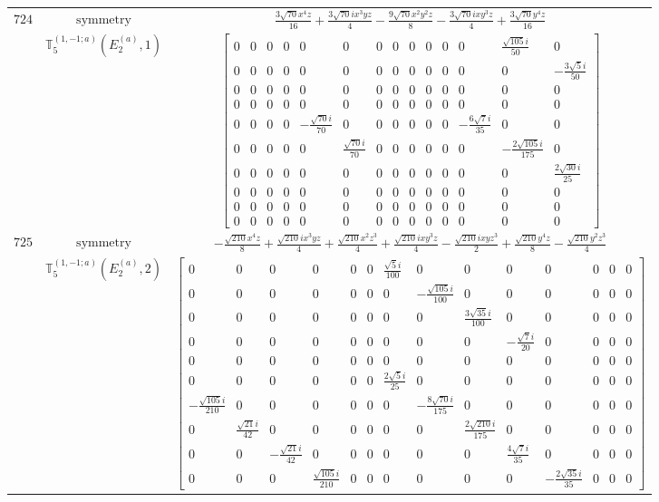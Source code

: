 \documentclass[fleqn,8pt,landscape]{jsarticle}
\begin{document}
\begin{longtable}{ccc}
$ 724 $ & $ \text{symmetry} $ & $ \frac{3 \sqrt{70} x^{4} z}{16} + \frac{3 \sqrt{70} i x^{3} y z}{4} - \frac{9 \sqrt{70} x^{2} y^{2} z}{8} - \frac{3 \sqrt{70} i x y^{3} z}{4} + \frac{3 \sqrt{70} y^{4} z}{16} $ \\
$  $ & $ \mathbb{T}_{5}^{(1,-1;a)}(E_{2}^{(a)},1) $ & $ \begin{bmatrix} 0 & 0 & 0 & 0 & 0 & 0 & 0 & 0 & 0 & 0 & 0 & 0 & \frac{\sqrt{105} i}{50} & 0 \\ 0 & 0 & 0 & 0 & 0 & 0 & 0 & 0 & 0 & 0 & 0 & 0 & 0 & - \frac{3 \sqrt{5} i}{50} \\ 0 & 0 & 0 & 0 & 0 & 0 & 0 & 0 & 0 & 0 & 0 & 0 & 0 & 0 \\ 0 & 0 & 0 & 0 & 0 & 0 & 0 & 0 & 0 & 0 & 0 & 0 & 0 & 0 \\ 0 & 0 & 0 & 0 & - \frac{\sqrt{70} i}{70} & 0 & 0 & 0 & 0 & 0 & 0 & - \frac{6 \sqrt{7} i}{35} & 0 & 0 \\ 0 & 0 & 0 & 0 & 0 & \frac{\sqrt{70} i}{70} & 0 & 0 & 0 & 0 & 0 & 0 & - \frac{2 \sqrt{105} i}{175} & 0 \\ 0 & 0 & 0 & 0 & 0 & 0 & 0 & 0 & 0 & 0 & 0 & 0 & 0 & \frac{2 \sqrt{30} i}{25} \\ 0 & 0 & 0 & 0 & 0 & 0 & 0 & 0 & 0 & 0 & 0 & 0 & 0 & 0 \\ 0 & 0 & 0 & 0 & 0 & 0 & 0 & 0 & 0 & 0 & 0 & 0 & 0 & 0 \\ 0 & 0 & 0 & 0 & 0 & 0 & 0 & 0 & 0 & 0 & 0 & 0 & 0 & 0 \end{bmatrix} $ \\ \hline
$ 725 $ & $ \text{symmetry} $ & $ - \frac{\sqrt{210} x^{4} z}{8} + \frac{\sqrt{210} i x^{3} y z}{4} + \frac{\sqrt{210} x^{2} z^{3}}{4} + \frac{\sqrt{210} i x y^{3} z}{4} - \frac{\sqrt{210} i x y z^{3}}{2} + \frac{\sqrt{210} y^{4} z}{8} - \frac{\sqrt{210} y^{2} z^{3}}{4} $ \\
$  $ & $ \mathbb{T}_{5}^{(1,-1;a)}(E_{2}^{(a)},2) $ & $ \begin{bmatrix} 0 & 0 & 0 & 0 & 0 & 0 & \frac{\sqrt{5} i}{100} & 0 & 0 & 0 & 0 & 0 & 0 & 0 \\ 0 & 0 & 0 & 0 & 0 & 0 & 0 & - \frac{\sqrt{105} i}{100} & 0 & 0 & 0 & 0 & 0 & 0 \\ 0 & 0 & 0 & 0 & 0 & 0 & 0 & 0 & \frac{3 \sqrt{35} i}{100} & 0 & 0 & 0 & 0 & 0 \\ 0 & 0 & 0 & 0 & 0 & 0 & 0 & 0 & 0 & - \frac{\sqrt{7} i}{20} & 0 & 0 & 0 & 0 \\ 0 & 0 & 0 & 0 & 0 & 0 & 0 & 0 & 0 & 0 & 0 & 0 & 0 & 0 \\ 0 & 0 & 0 & 0 & 0 & 0 & \frac{2 \sqrt{5} i}{25} & 0 & 0 & 0 & 0 & 0 & 0 & 0 \\ - \frac{\sqrt{105} i}{210} & 0 & 0 & 0 & 0 & 0 & 0 & - \frac{8 \sqrt{70} i}{175} & 0 & 0 & 0 & 0 & 0 & 0 \\ 0 & \frac{\sqrt{21} i}{42} & 0 & 0 & 0 & 0 & 0 & 0 & \frac{2 \sqrt{210} i}{175} & 0 & 0 & 0 & 0 & 0 \\ 0 & 0 & - \frac{\sqrt{21} i}{42} & 0 & 0 & 0 & 0 & 0 & 0 & \frac{4 \sqrt{7} i}{35} & 0 & 0 & 0 & 0 \\ 0 & 0 & 0 & \frac{\sqrt{105} i}{210} & 0 & 0 & 0 & 0 & 0 & 0 & - \frac{2 \sqrt{35} i}{35} & 0 & 0 & 0 \end{bmatrix} $ \\ \hline

\end{longtable}
\end{document}
